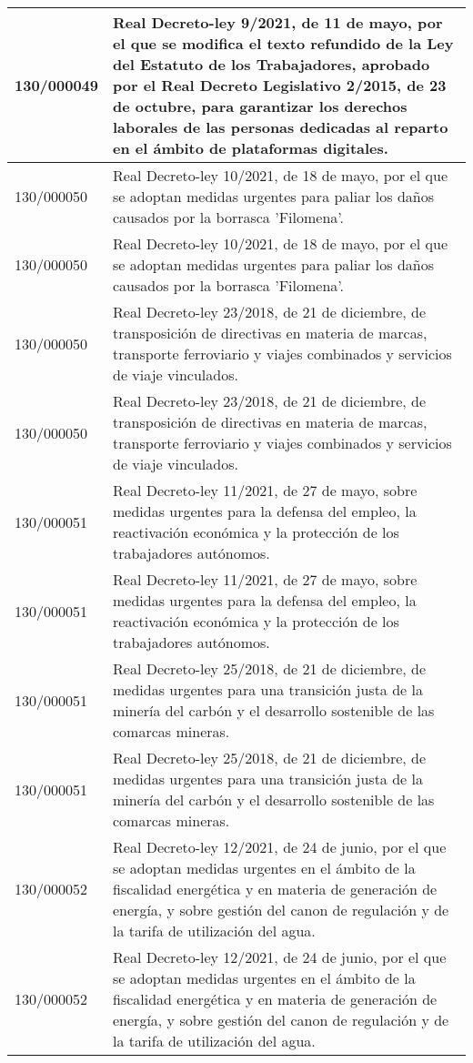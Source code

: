 {\begin{table}[H]
\begin{center}
\begin{tabularx}{\linewidth}{| l | X |}
\hline
130/000049 & Real Decreto-ley 9/2021, de 11 de mayo, por el que se modifica el texto refundido de la Ley del Estatuto de los Trabajadores, aprobado por el Real Decreto Legislativo 2/2015, de 23 de octubre, para garantizar los derechos laborales de las personas dedicadas al reparto en el ámbito de plataformas digitales. \\
\hline
130/000050 & Real Decreto-ley 10/2021, de 18 de mayo, por el que se adoptan medidas urgentes para paliar los daños causados por la borrasca 'Filomena'. \\
\hline
130/000050 & Real Decreto-ley 10/2021, de 18 de mayo, por el que se adoptan medidas urgentes para paliar los daños causados por la borrasca 'Filomena'. \\
\hline
130/000050 & Real Decreto-ley 23/2018, de 21 de diciembre, de transposición de directivas en materia de marcas, transporte ferroviario y viajes combinados y servicios de viaje vinculados. \\
\hline
130/000050 & Real Decreto-ley 23/2018, de 21 de diciembre, de transposición de directivas en materia de marcas, transporte ferroviario y viajes combinados y servicios de viaje vinculados. \\
\hline
130/000051 & Real Decreto-ley 11/2021, de 27 de mayo, sobre medidas urgentes para la defensa del empleo, la reactivación económica y la protección de los trabajadores autónomos. \\
\hline
130/000051 & Real Decreto-ley 11/2021, de 27 de mayo, sobre medidas urgentes para la defensa del empleo, la reactivación económica y la protección de los trabajadores autónomos. \\
\hline
130/000051 & Real Decreto-ley 25/2018, de 21 de diciembre, de medidas urgentes para una transición justa de la minería del carbón y el desarrollo sostenible de las comarcas mineras. \\
\hline
130/000051 & Real Decreto-ley 25/2018, de 21 de diciembre, de medidas urgentes para una transición justa de la minería del carbón y el desarrollo sostenible de las comarcas mineras. \\
\hline
130/000052 & Real Decreto-ley 12/2021, de 24 de junio, por el que se adoptan medidas urgentes en el ámbito de la fiscalidad energética y en materia de generación de energía, y sobre gestión del canon de regulación y de la tarifa de utilización del agua. \\
\hline
130/000052 & Real Decreto-ley 12/2021, de 24 de junio, por el que se adoptan medidas urgentes en el ámbito de la fiscalidad energética y en materia de generación de energía, y sobre gestión del canon de regulación y de la tarifa de utilización del agua. \\

\end{tabularx}
\end{center}
\end{table}}
